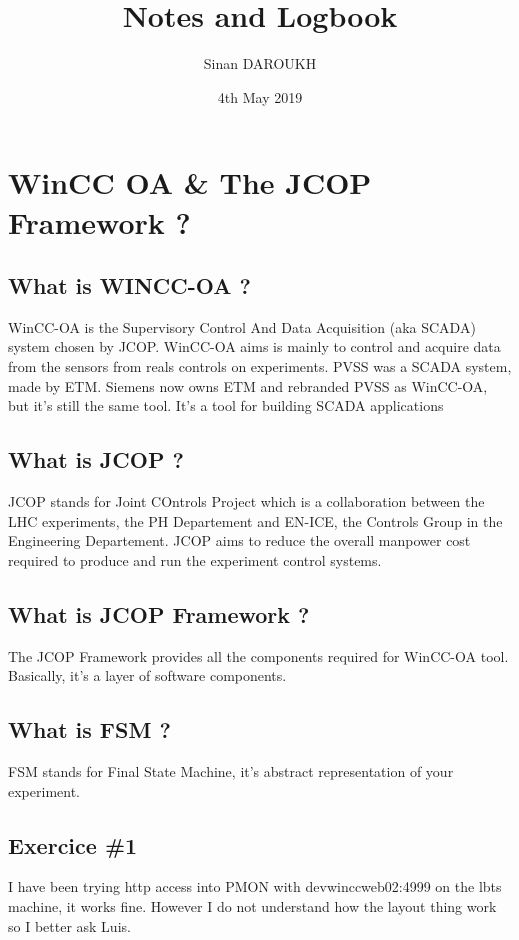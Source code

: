 \documentclass[a4paper, 10pt]{article}
\title{Notes and Logbook}
\author{Sinan DAROUKH}
\date{4th May 2019}
\begin{document}
\begin{titlepage}
\maketitle
\end{titlepage}

\tableofcontents
\newpage

\section{WinCC OA \&  The JCOP Framework ?}
\subsection{What is WINCC-OA ?}
WinCC-OA is the Supervisory Control And Data Acquisition (aka SCADA) system chosen by JCOP.
WinCC-OA aims is mainly to control and acquire data from the sensors from reals controls on experiments.
PVSS was a SCADA system, made by ETM. Siemens now owns ETM and rebranded PVSS as WinCC-OA, but it's still the same tool.
It's a tool for building SCADA applications

\subsection{What is JCOP ?}
JCOP stands for Joint COntrols Project which is a collaboration between the LHC experiments, the PH Departement and EN-ICE, the Controls Group in the Engineering Departement. JCOP aims to reduce the overall manpower cost required to produce and run the experiment control systems.

\subsection{What is JCOP Framework ?}
The JCOP Framework provides all the components required for WinCC-OA tool. Basically, it's a layer of software components.

\subsection{What is FSM ?}
FSM stands for Final State Machine, it's abstract representation of your experiment.


\subsection{Exercice \#1}
I have been trying http access into PMON with devwinccweb02:4999 on the lbts machine, it works fine.
However I do not understand how the layout thing work so I better ask Luis.
\end{document}
